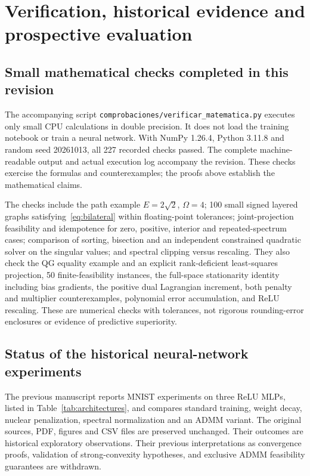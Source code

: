 \section{Verification, historical evidence and prospective evaluation}\label{sec:evidence}
\subsection{Small mathematical checks completed in this revision}
The accompanying script \texttt{comprobaciones/verificar\_matematica.py} executes only small CPU calculations in double precision. It does not load the training notebook or train a neural network. With NumPy 1.26.4, Python 3.11.8 and random seed 20261013, all 227 recorded checks passed. The complete machine-readable output and actual execution log accompany the revision. These checks exercise the formulas and counterexamples; the proofs above establish the mathematical claims.

The checks include the path example $E=2\sqrt2$, $\Omega=4$; 100 small signed layered graphs satisfying~\eqref{eq:bilateral} within floating-point tolerances; joint-projection feasibility and idempotence for zero, positive, interior and repeated-spectrum cases; comparison of sorting, bisection and an independent constrained quadratic solver on the singular values; and spectral clipping versus rescaling. They also check the QG equality example and an explicit rank-deficient least-squares projection, 50 finite-feasibility instances, the full-space stationarity identity including bias gradients, the positive dual Lagrangian increment, both penalty and multiplier counterexamples, polynomial error accumulation, and ReLU rescaling. These are numerical checks with tolerances, not rigorous rounding-error enclosures or evidence of predictive superiority.

\subsection{Status of the historical neural-network experiments}
The previous manuscript reports MNIST experiments on three ReLU MLPs, listed in Table~\ref{tab:architectures}, and compares standard training, weight decay, nuclear penalization, spectral normalization and an ADMM variant. The original sources, PDF, figures and CSV files are preserved unchanged. Their outcomes are historical exploratory observations. Their previous interpretations as convergence proofs, validation of strong-convexity hypotheses, and exclusive ADMM feasibility guarantees are withdrawn.


